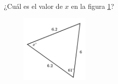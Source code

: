 ¿Cuál es el valor de $x$ en la figura \ref{fig:findangle04}?
\begin{figure}[H]
    \begin{center}
        \includegraphics[width=0.3\textwidth]{../images/findangle04.png}
    \end{center}
    \caption{}
    \label{fig:findangle04}
\end{figure}